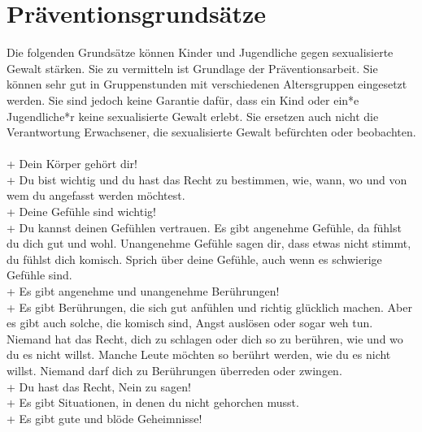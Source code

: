 \section*{Präventionsgrundsätze}

Die folgenden Grundsätze können Kinder und Jugendliche gegen sexualisierte Gewalt stärken. Sie zu vermitteln ist Grundlage der Präventionsarbeit.
Sie können sehr gut in Gruppenstunden mit verschiedenen Altersgruppen eingesetzt werden. Sie sind jedoch keine Garantie dafür, dass ein Kind oder ein*e Jugendliche*r keine sexualisierte Gewalt erlebt. Sie ersetzen
auch nicht die Verantwortung Erwachsener, die sexualisierte Gewalt befürchten oder beobachten. \\ \\
+ Dein Körper gehört dir! \\[5pt]
+ Du bist wichtig und du hast das Recht zu bestimmen, wie, wann, wo und von wem
\noindent\hspace*{2mm} du angefasst werden möchtest. \\[5pt]
+ Deine Gefühle sind wichtig! \\[5pt]
+ Du kannst deinen Gefühlen vertrauen. Es gibt angenehme Gefühle, da fühlst du
\noindent\hspace*{2mm} dich gut und wohl. Unangenehme Gefühle sagen dir, dass etwas nicht stimmt, du
\noindent\hspace*{2mm} fühlst dich komisch. Sprich über deine Gefühle, auch wenn es schwierige Gefühle
\noindent\hspace*{2mm} sind. \\[5pt]
+ Es gibt angenehme und unangenehme Berührungen! \\[5pt]
+ Es gibt Berührungen, die sich gut anfühlen und richtig glücklich machen. Aber es
\noindent\hspace*{2mm} gibt auch solche, die komisch sind, Angst auslösen oder sogar weh tun. Niemand
\noindent\hspace*{2mm} hat das Recht, dich zu schlagen oder dich so zu berühren, wie und wo du es nicht
\noindent\hspace*{2mm} willst. Manche Leute möchten so berührt werden, wie du es nicht willst. Niemand
\noindent\hspace*{2mm} darf dich zu Berührungen überreden oder zwingen. \\[5pt]
+ Du hast das Recht, Nein zu sagen! \\[5pt]
+ Es gibt Situationen, in denen du nicht gehorchen musst. \\[5pt]
+ Es gibt gute und blöde Geheimnisse! \\[5pt]
